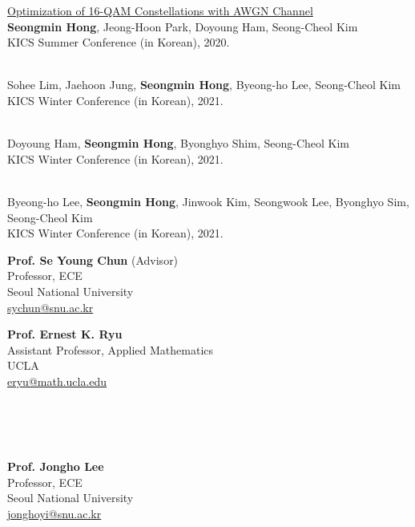 \begin{cvcontent}
\href{https://journal-home.s3.ap-northeast-2.amazonaws.com/site/2020kics/presentation/0387.pdf}{Optimization of 16-QAM Constellations with AWGN Channel}\\
\textbf{Seongmin Hong}, Jeong-Hoon Park, Doyoung Ham, Seong-Cheol Kim\\
KICS Summer Conference (in Korean), 2020.

\\
Sohee Lim, Jaehoon Jung, \textbf{Seongmin Hong}, Byeong-ho Lee, Seong-Cheol Kim\\
KICS Winter Conference (in Korean), 2021.

\\
Doyoung Ham, \textbf{Seongmin Hong}, Byonghyo Shim, Seong-Cheol Kim\\
KICS Winter Conference (in Korean), 2021.

\\
Byeong-ho Lee, \textbf{Seongmin Hong}, Jinwook Kim, Seongwook Lee, Byonghyo Sim, Seong-Cheol Kim\\
KICS Winter Conference (in Korean), 2021.

\end{cvcontent}
\begin{cvcontent}
    \begin{minipage}[t]{0.5\textwidth}
        \textbf{Prof. Se Young Chun} (Advisor)\\
        Professor, ECE\\
        Seoul National University\\
        \href{mailto:sychun@snu.ac.kr}{sychun@snu.ac.kr}
    \end{minipage}
    \begin{minipage}[t]{0.5\textwidth}
        \textbf{Prof. Ernest K. Ryu}\\
        Assistant Professor, Applied Mathematics\\
        UCLA\\
        \href{mailto:eryu@math.ucla.edu}{eryu@math.ucla.edu}
    \end{minipage}
    \\
    \\
    \\
    \begin{minipage}[t]{0.5\textwidth}
        \textbf{Prof. Jongho Lee}\\
        Professor, ECE\\
        Seoul National University\\
        \href{mailto:jonghoyi@snu.ac.kr}{jonghoyi@snu.ac.kr}
    \end{minipage}
\end{cvcontent}

